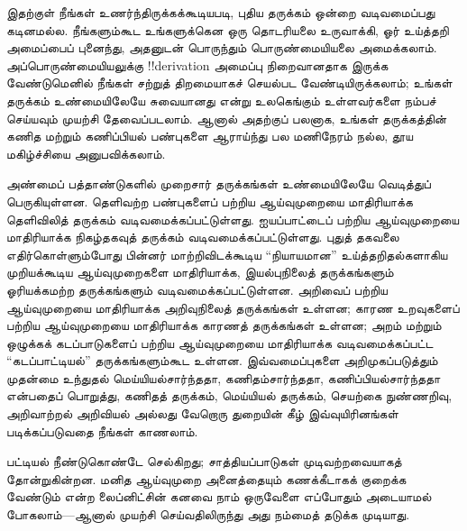 \documentclass[../../../include/open-logic-section]{subfiles}
\begin{document}



இதற்குள் நீங்கள் உணர்ந்திருக்கக்கூடியபடி, புதிய தருக்கம் ஒன்றை
வடிவமைப்பது கடினமல்ல. நீங்களும்கூட உங்களுக்கென ஒரு தொடரியலை
உருவாக்கி, ஓர் உய்த்தறி அமைப்பைப் புனைந்து, அதனுடன் பொருந்தும்
பொருண்மையியலை அமைக்கலாம். அப்பொருண்மையியலுக்கு !!{derivation}
அமைப்பு நிறைவானதாக இருக்க வேண்டுமெனில் நீங்கள் சற்றுத் திறமையாகச்
செயல்பட வேண்டியிருக்கலாம்; உங்கள் தருக்கம் உண்மையிலேயே சுவையானது என்று
உலகெங்கும் உள்ளவர்களை நம்பச் செய்யவும் முயற்சி தேவைப்படலாம். ஆனால்
அதற்குப் பலனாக, உங்கள் தருக்கத்தின் கணித மற்றும் கணிப்பியல் பண்புகளை
ஆராய்ந்து பல மணிநேரம் நல்ல, தூய மகிழ்ச்சியை அனுபவிக்கலாம்.

அண்மைப் பத்தாண்டுகளில் முறைசார் தருக்கங்கள் உண்மையிலேயே வெடித்துப்
பெருகியுள்ளன. தெளிவற்ற பண்புகளைப் பற்றிய ஆய்வுமுறையை மாதிரியாக்க
தெளிவிலித் தருக்கம் வடிவமைக்கப்பட்டுள்ளது. ஐயப்பாட்டைப் பற்றிய
ஆய்வுமுறையை மாதிரியாக்க நிகழ்தகவுத் தருக்கம் வடிவமைக்கப்பட்டுள்ளது.
புதுத் தகவலை எதிர்கொள்ளும்போது பின்னர் மாற்றிவிடக்கூடிய
``நியாயமான'' உய்த்தறிதல்களாகிய முறியக்கூடிய ஆய்வுமுறைகளை மாதிரியாக்க,
இயல்புநிலைத் தருக்கங்களும் ஓரியக்கமற்ற தருக்கங்களும்
வடிவமைக்கப்பட்டுள்ளன. அறிவைப் பற்றிய ஆய்வுமுறையை மாதிரியாக்க
அறிவுநிலைத் தருக்கங்கள் உள்ளன; காரண உறவுகளைப் பற்றிய ஆய்வுமுறையை
மாதிரியாக்க காரணத் தருக்கங்கள் உள்ளன; அறம் மற்றும் ஒழுக்கக்
கடப்பாடுகளைப் பற்றிய ஆய்வுமுறையை மாதிரியாக்க வடிவமைக்கப்பட்ட
``கடப்பாட்டியல்'' தருக்கங்களும்கூட உள்ளன. இவ்வமைப்புகளை அறிமுகப்படுத்தும்
முதன்மை உந்துதல் மெய்யியல்சார்ந்ததா, கணிதம்சார்ந்ததா,
கணிப்பியல்சார்ந்ததா என்பதைப் பொறுத்து, கணிதத் தருக்கம், மெய்யியல்
தருக்கம், செயற்கை நுண்ணறிவு, அறிவாற்றல் அறிவியல் அல்லது வேறொரு
துறையின் கீழ் இவ்வுயிரினங்கள் படிக்கப்படுவதை நீங்கள் காணலாம்.

பட்டியல் நீண்டுகொண்டே செல்கிறது; சாத்தியப்பாடுகள் முடிவற்றவையாகத்
தோன்றுகின்றன. மனித ஆய்வுமுறை அனைத்தையும் கணக்கீடாகக் குறைக்க வேண்டும்
என்ற லைப்னிட்சின் கனவை நாம் ஒருவேளை எப்போதும் அடையாமல் போகலாம்---ஆனால்
முயற்சி செய்வதிலிருந்து அது நம்மைத் தடுக்க முடியாது.
\end{document}
